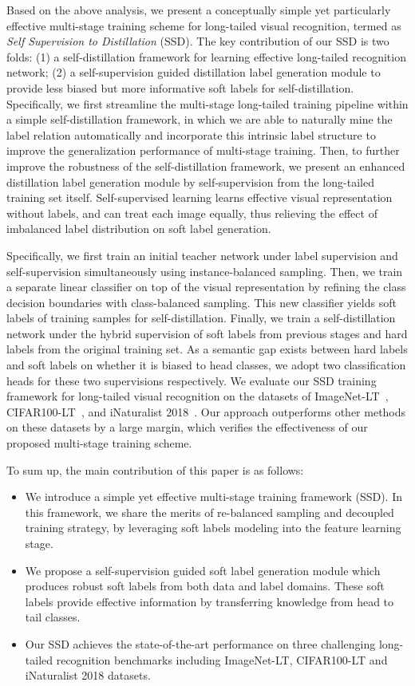 \documentclass[10pt,twocolumn,letterpaper]{article}
\begin{document}
Based on the above analysis, we present a conceptually simple yet particularly effective multi-stage training scheme for long-tailed visual recognition, termed as {\em Self Supervision to Distillation} (SSD). The key contribution of our SSD is two folds: (1) a self-distillation framework for learning effective long-tailed recognition network; (2) a self-supervision guided distillation label generation module to provide less biased but more informative soft labels for self-distillation. Specifically, we first streamline the multi-stage long-tailed training pipeline within a simple self-distillation framework, in which we are able to naturally mine the label relation automatically and incorporate this intrinsic label structure to improve the generalization performance of multi-stage training. Then, to further improve the robustness of the self-distillation framework, we present an enhanced distillation label generation module by self-supervision from the long-tailed training set itself. Self-supervised learning learns effective visual representation without labels, and can treat each image equally, thus relieving the effect of imbalanced label distribution on soft label generation.

Specifically, we first train an initial teacher network under label supervision and self-supervision simultaneously using instance-balanced sampling. Then, we train a separate linear classifier on top of the visual representation by refining the class decision boundaries with class-balanced sampling. This new classifier yields soft labels of training samples for self-distillation. Finally, we train a self-distillation network under the hybrid supervision of soft labels from previous stages and hard labels from the original training set. As a semantic gap exists between hard labels and soft labels on whether it is biased to head classes, we adopt two classification heads for these two supervisions respectively. We evaluate our SSD training framework for long-tailed visual recognition on the datasets of  ImageNet-LT~\cite{OLTR}, CIFAR100-LT~\cite{LDAM}, and iNaturalist 2018~\cite{iNat_dataset}. Our approach outperforms other methods on these datasets by a large margin, which verifies the effectiveness of our proposed multi-stage training scheme.

To sum up, the main contribution of this paper is as follows:
\begin{itemize}
    \item We introduce a simple yet effective multi-stage training framework (SSD). In this framework, we share the merits of re-balanced sampling and decoupled training strategy, by leveraging soft labels modeling into the feature learning stage.
    \item We propose a self-supervision guided soft label generation module which produces robust soft labels from both data and label domains. These soft labels provide effective information by transferring knowledge from head to tail classes.
    \item Our SSD achieves the state-of-the-art performance on three challenging long-tailed recognition benchmarks including ImageNet-LT, CIFAR100-LT and iNaturalist 2018 datasets.
\end{itemize}
\end{document}

